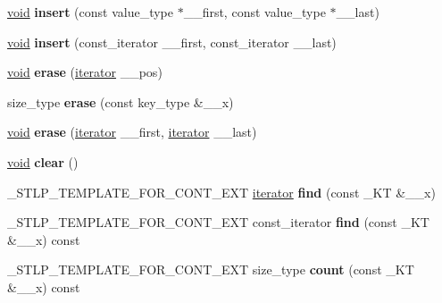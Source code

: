 \begin{DoxyCompactItemize}
\hyperlink{interfacevoid}{void} {\bfseries insert} (const value\+\_\+type $\ast$\+\_\+\+\_\+first, const value\+\_\+type $\ast$\+\_\+\+\_\+last)
\item 
\mbox{\label{classmultiset_a1b8b770a8cf95a976a9868af84f72b60}} 
\hyperlink{interfacevoid}{void} {\bfseries insert} (const\+\_\+iterator \+\_\+\+\_\+first, const\+\_\+iterator \+\_\+\+\_\+last)
\item 
\mbox{\label{classmultiset_a7dfc7ee3d44b830efb8d3f9212b1d35b}} 
\hyperlink{interfacevoid}{void} {\bfseries erase} (\hyperlink{structiterator}{iterator} \+\_\+\+\_\+pos)
\item 
\mbox{\label{classmultiset_afbbb87ac132b86f16d44cc814d7a7ba0}} 
size\+\_\+type {\bfseries erase} (const key\+\_\+type \&\+\_\+\+\_\+x)
\item 
\mbox{\label{classmultiset_a1abc6699a02201bf43de23d41db0a291}} 
\hyperlink{interfacevoid}{void} {\bfseries erase} (\hyperlink{structiterator}{iterator} \+\_\+\+\_\+first, \hyperlink{structiterator}{iterator} \+\_\+\+\_\+last)
\item 
\mbox{\label{classmultiset_acb2c89744be080829d1e07221efb6137}} 
\hyperlink{interfacevoid}{void} {\bfseries clear} ()
\item 
\mbox{\label{classmultiset_a73d13b5089450963952e1822921645a6}} 
\+\_\+\+S\+T\+L\+P\+\_\+\+T\+E\+M\+P\+L\+A\+T\+E\+\_\+\+F\+O\+R\+\_\+\+C\+O\+N\+T\+\_\+\+E\+XT \hyperlink{structiterator}{iterator} {\bfseries find} (const \+\_\+\+KT \&\+\_\+\+\_\+x)
\item 
\mbox{\label{classmultiset_a9805049aedc2f7ee3ff6812fc78cc8e4}} 
\+\_\+\+S\+T\+L\+P\+\_\+\+T\+E\+M\+P\+L\+A\+T\+E\+\_\+\+F\+O\+R\+\_\+\+C\+O\+N\+T\+\_\+\+E\+XT const\+\_\+iterator {\bfseries find} (const \+\_\+\+KT \&\+\_\+\+\_\+x) const
\item 
\mbox{\label{classmultiset_a22eceb508c5b95f12b2bf2cb3c8afea2}} 
\+\_\+\+S\+T\+L\+P\+\_\+\+T\+E\+M\+P\+L\+A\+T\+E\+\_\+\+F\+O\+R\+\_\+\+C\+O\+N\+T\+\_\+\+E\+XT size\+\_\+type {\bfseries count} (const \+\_\+\+KT \&\+\_\+\+\_\+x) const
\item 

\end{DoxyCompactItemize}
